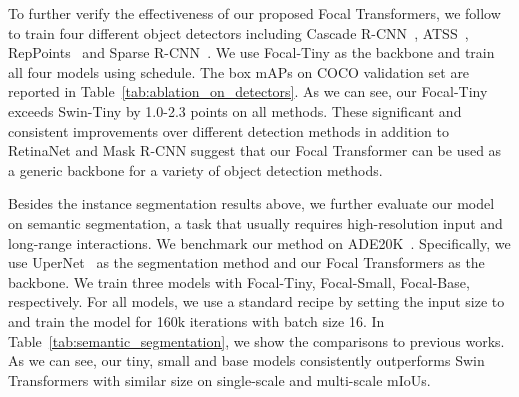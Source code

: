 \documentclass{article}
\begin{document}
To further verify the effectiveness of our proposed Focal Transformers, we follow~\cite{liu2021swin} to train four different object detectors including Cascade R-CNN~\cite{cai2018cascade}, ATSS~\cite{zhang2020bridging}, RepPoints~\cite{yang2019reppoints} and Sparse R-CNN~\cite{sun2020sparse}. We use Focal-Tiny as the backbone and train all four models using  schedule. The box mAPs on COCO validation set are reported in Table~\ref{tab:ablation_on_detectors}. As we can see, our Focal-Tiny exceeds Swin-Tiny by 1.0-2.3 points on all methods. These significant and consistent improvements over different detection methods in addition to RetinaNet and Mask R-CNN suggest that our Focal Transformer can be used as a generic backbone for a variety of object detection methods.

Besides the instance segmentation results above, we further evaluate our model on semantic segmentation, a task that usually requires high-resolution input and long-range interactions. We benchmark our method on ADE20K~\cite{zhou2017scene}. Specifically, we use UperNet~\cite{xiao2018unified} as the segmentation method and our Focal Transformers as the backbone. We train three models with Focal-Tiny, Focal-Small, Focal-Base, respectively. For all models, we use a standard recipe by setting the input size to  and train the model for 160k iterations with batch size 16. In Table~\ref{tab:semantic_segmentation}, we show the comparisons to previous works. As we can see, our tiny, small and base models consistently outperforms Swin Transformers with similar size on single-scale and multi-scale mIoUs. 
\end{document}
